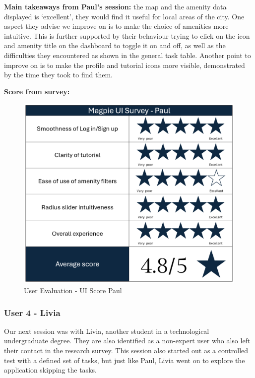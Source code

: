 \textbf{Main takeaways from Paul's session: }the map and the amenity data
displayed is `excellent', they would find it useful for local areas of the city.
One aspect they advise we improve on is to make the choice of amenities more
intuitive. This is further supported by their behaviour trying to click on the
icon and amenity title on the dashboard to toggle it on and off, as well as the
difficulties they encountered as shown in the general task table. Another point
to improve on is to make the profile and tutorial icons more visible,
demonstrated by the time they took to find them.

\newpage{}

\noindent\textbf{Score from survey: }

\begin{figure}[h!]
    \centering
    \includegraphics[width=\textwidth]{images/survey-paul.png}
    \caption{User Evaluation - UI Score Paul}
\end{figure}

\newpage{}

\subsubsection{User 4 - Livia}
Our next session was with Livia, another student in a technological
undergraduate degree. They are also identified as a non-expert user who also left
their contact in the research survey. This session also started out as a
controlled test with a defined set of tasks, but just like Paul, Livia went on
to explore the application skipping the tasks.


